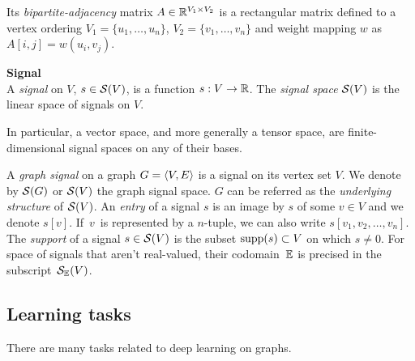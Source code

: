 Its \emph{bipartite-adjacency} matrix $A \in \mathbb{R}^{V_1 \times V_2}$ is a rectangular matrix defined \wrt to a vertex ordering $V_1 = \{u_1, \ldots, u_n\}$, $V_2 = \{v_1, \ldots, v_n\}$ and weight mapping $w$ as $A[i,j] = w(u_i,v_j)$.

\begin{definition}\textbf{Signal}\\
A \emph{signal} on $V$, $s \in \mathcal{S}(V)$, is a function $s: V \rightarrow \mathbb{R}$.
The \emph{signal space} $\mathcal{S}(V)$ is the linear space of signals on $V$.
\end{definition}

\begin{remark}
In particular, a vector space, and more generally a tensor space, are finite-dimensional signal spaces on any of their bases.
\end{remark}

A \emph{graph signal} on a graph $G = \langle V, E \rangle$ is a signal on its vertex set $V$. We denote by $\mathcal{S}(G)$ or $\mathcal{S}(V)$ the graph signal space. $G$ can be referred as the \emph{underlying structure} of $\mathcal{S}(V)$.
An \emph{entry} of a signal $s$ is an image by $s$ of some $v \in V$ and we denote $s[v]$. If~$v$~is represented by a $n$-tuple, we can also write $s[v_1, v_2, \ldots, v_n]$.
The \emph{support} of a signal $s \in \mathcal{S}(V)$ is the subset $\operatorname{supp}(s) \subset V$ on which $s \neq 0$.
For space of signals that aren't real-valued, their codomain~$\mathbb{E}$ is precised in the subscript~$\mathcal{S}_{\mathbb{E}}(V)$.

\subsection{Learning tasks}

There are many tasks related to deep learning on graphs.%

